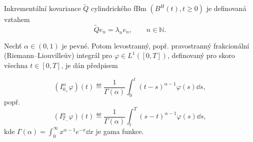 \begin{definice}
    Inkrementální kovariance $\tilde{Q}$ cylindrického fBm $\left(B^H(t),t\geq0\right)$
    je definovaná vztahem
    $$ \tilde{Q}e_n = \lambda_n e_n, \qquad n\in\mathbb{N}. $$ 
\end{definice}


\begin{definice}\label{def:fracint}
    Nechť $\alpha\in \left( 0,1 \right)$ je pevné. Potom levostranný, popř.
    pravostranný frakcionální (Riemann--Liouvilleův) integrál pro
    $\varphi\in L^1 \left( \left[ 0,T \right] \right)$, definovaný pro skoro
    všechna $t\in\left[ 0,T \right]$, je dán předpisem
        
        $$\left( I_{0_+}^\alpha \varphi \right) \left( t \right) \eqdef
        \frac{1}{\Gamma(\alpha)}\int_{0}^{t} \left(t-s\right)^{\alpha-1} \varphi(s)
        \dd s,$$
    popř.
        $$\left( I_{T_-}^\alpha \varphi \right) \left( t \right) \eqdef
        \frac{1}{\Gamma(\alpha)}\int_{t}^{T} \left(s-t\right)^{\alpha-1} \varphi(s)
        \dd s,$$
        kde $\Gamma(\alpha)=\int_0^\infty x^{\alpha-1}e^{-x}\dd x$ je gama funkce.
\end{definice}


